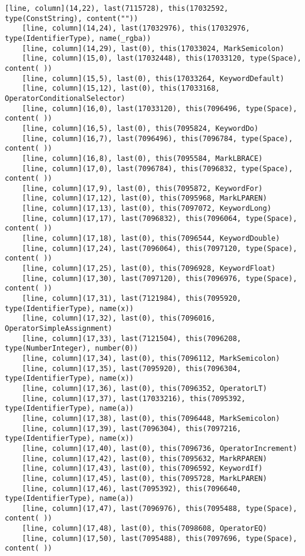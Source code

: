 \documentclass[UTF8]{ctexart}
\begin{document}
{\begin{lstlisting}[language={[ANSI]C++}]
    [line, column](14,22), last(7115728), this(17032592, type(ConstString), content(""))
    [line, column](14,24), last(17032976), this(17032976, type(IdentifierType), name(_rgba))
    [line, column](14,29), last(0), this(17033024, MarkSemicolon)
    [line, column](15,0), last(17032448), this(17033120, type(Space), content( ))
    [line, column](15,5), last(0), this(17033264, KeywordDefault)
    [line, column](15,12), last(0), this(17033168, OperatorConditionalSelector)
    [line, column](16,0), last(17033120), this(7096496, type(Space), content( ))
    [line, column](16,5), last(0), this(7095824, KeywordDo)
    [line, column](16,7), last(7096496), this(7096784, type(Space), content( ))
    [line, column](16,8), last(0), this(7095584, MarkLBRACE)
    [line, column](17,0), last(7096784), this(7096832, type(Space), content( ))
    [line, column](17,9), last(0), this(7095872, KeywordFor)
    [line, column](17,12), last(0), this(7095968, MarkLPAREN)
    [line, column](17,13), last(0), this(7097072, KeywordLong)
    [line, column](17,17), last(7096832), this(7096064, type(Space), content( ))
    [line, column](17,18), last(0), this(7096544, KeywordDouble)
    [line, column](17,24), last(7096064), this(7097120, type(Space), content( ))
    [line, column](17,25), last(0), this(7096928, KeywordFloat)
    [line, column](17,30), last(7097120), this(7096976, type(Space), content( ))
    [line, column](17,31), last(7121984), this(7095920, type(IdentifierType), name(x))
    [line, column](17,32), last(0), this(7096016, OperatorSimpleAssignment)
    [line, column](17,33), last(7121504), this(7096208, type(NumberInteger), number(0))
    [line, column](17,34), last(0), this(7096112, MarkSemicolon)
    [line, column](17,35), last(7095920), this(7096304, type(IdentifierType), name(x))
    [line, column](17,36), last(0), this(7096352, OperatorLT)
    [line, column](17,37), last(17033216), this(7095392, type(IdentifierType), name(a))
    [line, column](17,38), last(0), this(7096448, MarkSemicolon)
    [line, column](17,39), last(7096304), this(7097216, type(IdentifierType), name(x))
    [line, column](17,40), last(0), this(7096736, OperatorIncrement)
    [line, column](17,42), last(0), this(7095632, MarkRPAREN)
    [line, column](17,43), last(0), this(7096592, KeywordIf)
    [line, column](17,45), last(0), this(7095728, MarkLPAREN)
    [line, column](17,46), last(7095392), this(7096640, type(IdentifierType), name(a))
    [line, column](17,47), last(7096976), this(7095488, type(Space), content( ))
    [line, column](17,48), last(0), this(7098608, OperatorEQ)
    [line, column](17,50), last(7095488), this(7097696, type(Space), content( ))

\end{lstlisting}}
\end{document}
